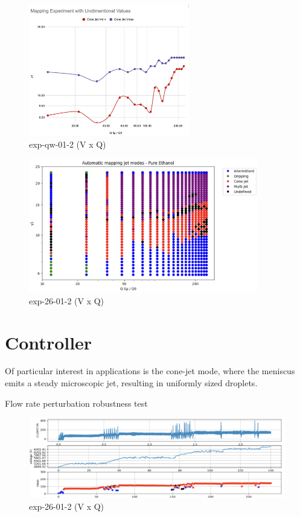    \begin{multicols}{2}

        \begin{figure}[H]
            \center
            \includegraphics[width=7cm]{Figuras/april/manual_non_dim_exp.png}
            \caption{ exp-qw-01-2 (V x Q)}
        \end{figure}

        \begin{figure}[H]
            \center
            \includegraphics[width=10cm]{Figuras/19:03/non-dimensional-1.png}
            \caption{ exp-26-01-2 (V x Q)}
        \end{figure}


    \end{multicols}

\section{Controller}
\label{sec:controller_results}

    Of particular interest in applications is the cone-jet mode, where the meniscus emits a steady microscopic jet, resulting in uniformly sized droplets. 

        Flow rate perturbation robustness test

        \begin{figure}[H]
            \center
            \includegraphics[width=17cm]{Figuras/19:03/control_first_results.png}
            \caption{ exp-26-01-2 (V x Q)}
        \end{figure}


